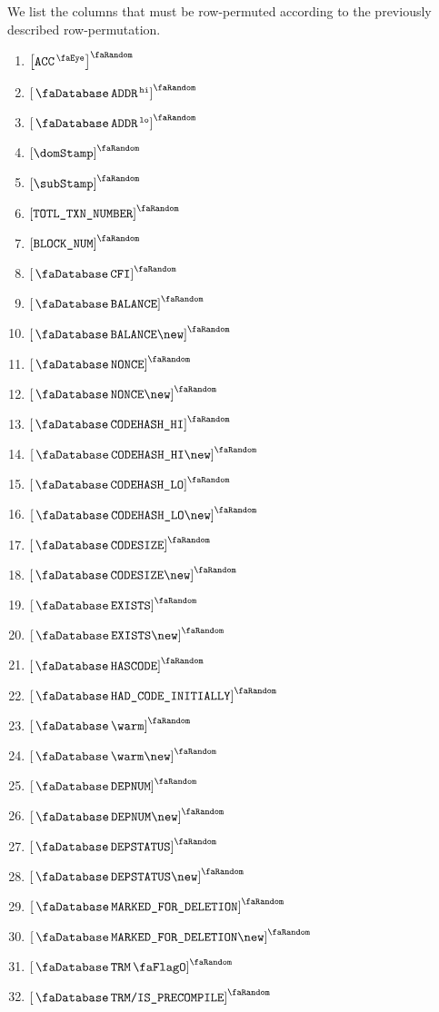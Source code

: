 We list the columns that must be row-permuted according to the previously described row-permutation.
\begin{multicols}{3}
	\begin{enumerate}
		\item $\order{\peekAccount}$
		\item $\order{\accAddress\high}$
		\item $\order{\accAddress\low}$
		\item $\order{\domStamp}$
		\item $\order{\subStamp}$
		\item $\order{\totalTransactionNumber}$
		\item $\order{\relBlockNum}$
		\item $\order{\accCfi}$
		\item $\order{\accBalance}$
		\item $\order{\accBalance\new}$
		\item $\order{\accNonce}$
		\item $\order{\accNonce\new}$
		\item $\order{\accCodehashHi}$
		\item $\order{\accCodehashHi\new}$
		\item $\order{\accCodehashLo}$
		\item $\order{\accCodehashLo\new}$
		\item $\order{\accCodesize}$
		\item $\order{\accCodesize\new}$
		\item $\order{\accExists}$
		\item $\order{\accExists\new}$
		\item $\order{\accHasCode}$
		\item $\order{\accHadCodeInitially}$
		\item $\order{\accWarmth}$
		\item $\order{\accWarmth\new}$
		\item $\order{\accDeploymentNumber}$
		\item $\order{\accDeploymentNumber\new}$
		\item $\order{\accDeploymentStatus}$
		\item $\order{\accDeploymentStatus\new}$
		\item $\order{\accMarkedForDeletion}$
		\item $\order{\accMarkedForDeletion\new}$
		\item $\order{\accTrmFlag}$
		\item $\order{\accTrmIsPrecompile}$
	\end{enumerate}
\end{multicols}
